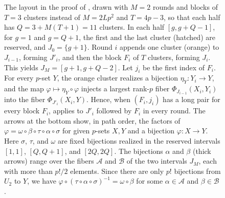 \documentclass[fontsize=12pt,leading=14pt]{fullpaper}
\newcommand{\Acal}{\mathcal{A}}
\newcommand{\Bcal}{\mathcal{B}}
\begin{document}
\begin{figure}[ht]
  \caption{The layout in the proof of , drawn with $M=2$ rounds and blocks of $T=3$ clusters instead of $M=2Lp^2$ and $T=4p-3$, so that each half has $Q=3+M(T+1)=11$ clusters.
    In each half $[g,g+Q-1]$, for $g=1$ and $g=Q+1$, the first and the last cluster (hatched) are reserved, and $J_0=\{g+1\}$.
    Round $i$ appends one cluster (orange) to $J_{i-1}$, forming $J'_i$, and then the block $F_i$ of $T$ clusters, forming $J_i$.
    This yields $J_M=[g+1,g+Q-2]$.
    Let $j_i$ be the first index of $F_i$.
    For every $p$-set $Y$, the orange cluster realizes a bijection $\eta_Y\colon Y_i\to Y$, and the map $\varphi\mapsto\eta_Y\circ\varphi$ injects a largest rank-$p$ fiber $\Phi_{J_{i-1}}(X_i,Y_i)$ into the fiber $\Phi_{J'_i}(X_i,Y)$.
    Hence, when $(F_i,j_i)$ has a long pair for every block $F_i$,  applies to $J'_i$ followed by $F_i$ in every round.
    The arrows at the bottom show, in path order, the factors of $\varphi=\omega\circ\beta\circ\tau\circ\alpha\circ\sigma$ for given $p$-sets $X,Y$ and a bijection $\varphi\colon X\to Y$.
    Here $\sigma$, $\tau$, and $\omega$ are fixed bijections realized in the reserved intervals $[1,1]$, $[Q,Q+1]$, and $[2Q,2Q]$.
    The bijections $\alpha$ and $\beta$ (thick arrows) range over the fibers $\Acal$ and $\Bcal$ of the two intervals $J_M$, each with more than $p!/2$ elements.
  Since there are only $p!$ bijections from $U_2$ to $Y$, we have $\varphi\circ(\tau\circ\alpha\circ\sigma)^{-1}=\omega\circ\beta$ for some $\alpha\in\Acal$ and $\beta\in\Bcal$.}
  \label{fig:s3-extraction}
\end{figure}
\end{document}
